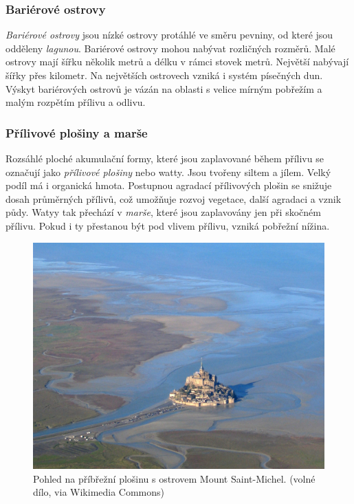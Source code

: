 \subsubsection{Bariérové ostrovy}
\emph{Bariérové ostrovy} jsou nízké ostrovy protáhlé ve směru pevniny, od které jsou odděleny \emph{lagunou}. Bariérové ostrovy mohou nabývat rozličných rozměrů. Malé ostrovy mají šířku několik metrů a délku v rámci stovek metrů. Největší nabývají šířky přes kilometr. Na největších ostrovech vzniká i systém písečných dun. Výskyt bariérových ostrovů je vázán na oblasti s velice mírným pobřežím a malým rozpětím přílivu a odlivu.

\subsubsection{Přílivové plošiny a marše}
Rozsáhlé ploché akumulační formy, které jsou zaplavované během přílivu se označují jako \emph{přílivové plošiny} nebo {watty}. Jsou tvořeny siltem a jílem. Velký podíl má i organická hmota. Postupnou agradací přílivových plošin se snižuje dosah průměrných přílivů, což umožňuje rozvoj vegetace, další agradaci a vznik půdy. Watyy tak přechází v \emph{marše}, které jsou zaplavovány jen při skočném přílivu. Pokud i ty přestanou být pod vlivem přílivu, vzniká pobřežní nížina. 

\begin{figure}[h]
	\centering
	\includegraphics[width=1\linewidth]{obrazky/marine/watty}
	\caption{Pohled na příbřežní plošinu s ostrovem Mount Saint-Michel. (volné dílo, via Wikimedia Commons)}
	\label{fig:watty}
\end{figure}

